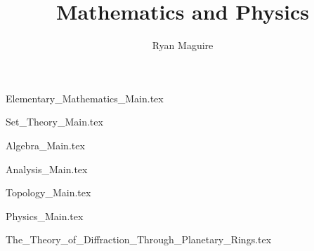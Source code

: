 \documentclass[crop=false,class=book,oneside]{standalone}
\title{Mathematics and Physics}
\author{Ryan Maguire}
\date{\vspace{-5ex}}
\begin{document}
    \maketitle
    \tableofcontents
    \listoffigures
    \listoftables
    \clearpage
    \newif\ifmain

        
               {Elementary_Mathematics_Main.tex}


        {Set_Theory_Main.tex}

        {Algebra_Main.tex}
    
        {Analysis_Main.tex}

        {Topology_Main.tex}


        {Physics_Main.tex}

        
                {The_Theory_of_Diffraction_Through_Planetary_Rings.tex}

    \printglossary[type=\acronymtype]
    \clearpage
    \printglossary[style=long]
    \clearpage

    
\end{document}
